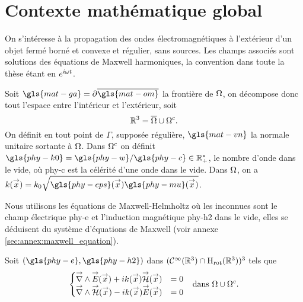 


\chapter{Contexte mathématique global}

\label{sec:context_math}
\minitoc
\newpage

On s’intéresse à la propagation des ondes électromagnétiques à l'extérieur d'un objet fermé borné et convexe et régulier, sans sources. 
Les champs associés sont solutions des équations de Maxwell harmoniques, la convention dans toute la thèse étant en \(e^{i\omega t}\). 

Soit \(\gls{mat-ga}=\partial\overline{\gls{mat-om}}\) la frontière de \(\Omega\), on décompose donc tout l'espace entre l'intérieur et l'extérieur, soit 
\[
\mathbb R^3 = \overline{\Omega}\cup{\Omega}^c.
\]
On définit en tout point de \(\Gamma\), supposée régulière, \(\gls{mat-vn}\) la normale unitaire sortante à \(\Omega\).
Dans \(\Omega^c\) on définit \(\gls{phy-k0}=\gls{phy-w} / \gls{phy-c} \in \RR_+^*\), le nombre d'onde dans le vide, où \gls{phy-c} 
est la célérité d'une onde dans le vide.
Dans \(\Omega\), on a \(k(\vx)=k_0\sqrt{\gls{phy-eps}(\vx)\gls{phy-mu}(\vx)}\).


Nous utilisons les équations de Maxwell-Helmholtz où les inconnues sont le champ électrique \gls{phy-e} et l'induction magnétique \gls{phy-h2} dans le vide, elles se déduisent du système d'équations de Maxwell (voir annexe \ref{sec:annex:maxwell_equation}). 

Soit \((\gls{phy-e},\gls{phy-h2})\) dans \((\mathcal{C}^\infty(\mathbb R^3)\cap\mathrm{H}_\mathrm{rot}(\mathbb R^3))^3\) tels que
\begin{align}
\left\lbrace
\begin{matrix}
    {\overset{\rightarrow}{\nabla}}\wedge {\overset{\rightarrow}{E}}({\overset{\rightarrow}{x}}) + i k({\overset{\rightarrow}{x}}) {\overset{\rightarrow}{\mathcal{H}}}({\overset{\rightarrow}{x}}) &= 0
    \\
    {\overset{\rightarrow}{\nabla}}\wedge {\overset{\rightarrow}{\mathcal{H}}}({\overset{\rightarrow}{x}}) - i k({\overset{\rightarrow}{x}}) {\overset{\rightarrow}{E}}({\overset{\rightarrow}{x}}) &= 0
\end{matrix}
\right. && \text{dans \(\Omega\cup\Omega^c\).}
\label{eq:unicite:maxwell_ext}
\end{align}

